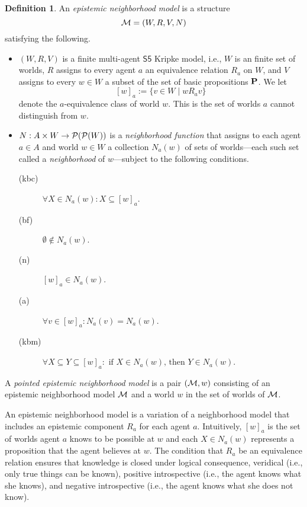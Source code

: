 \documentclass[12pt]{article}
\theoremstyle{definition}
\newtheorem{definition}[theorem]{Definition}
\newcommand{\pow}{{\cal P}}    %
\newcommand{\M}{{\cal M}}      %
\newcommand{\Prop}{{\bf P}}    %
\begin{document}
\begin{definition} 
  An \emph{epistemic neighborhood model} is a structure
  \[
  \M=(W,R,V,N)
  \]
  satisfying the following.
  \begin{itemize}
  \item $(W,R,V)$ is a finite multi-agent $\mathsf{S5}$ Kripke model, 
    i.e., $W$ is an finite set of worlds, $R$ assigns to every agent 
    $a$ an equivalence relation $R_a$ on $W$, and $V$ assigns to  
    every $w \in W$ a subset of the set of basic propositions $\Prop$. 
    We let 
    \[
    [w]_a:=\{v\in W\mid wR_av\}
    \]
    denote the $a$-equivalence class of world $w$.  This is the
    set of worlds $a$ cannot distinguish from $w$.

  \item $N : A\times W \to \pow(\pow(W))$ is a \emph{neighborhood
      function} that assigns to each agent $a\in A$ and world $w\in W$
    a collection $N_a(w)$ of sets of worlds---each such set called a
    \emph{neighborhood} of $w$---subject to the following conditions.
    \begin{description}
    \item[(kbc)] $\forall X \in N_a(w) : X \subseteq [w]_a$.

    \item[(bf)] $\emptyset\notin N_a(w)$.
      
    \item[(n)] $[w]_a\in N_a(w)$.
      
    \item[(a)] $\forall v \in [w]_a : N_a(v) = N_a(w)$.

    \item[(kbm)] $\forall X \subseteq Y \subseteq [w]_a : 
      \text{ if } X \in N_a(w) \text{, then } Y \in N_a(w)$.
   \end{description}
  \end{itemize}
  A \emph{pointed epistemic neighborhood model} is a pair $(\M,w)$
  consisting of an epistemic neighborhood model $\M$ and a world $w$
  in the set of worlds of $\M$. 
\end{definition}

An epistemic neighborhood model is a variation of a neighborhood model that
includes an epistemic component $R_a$ for each agent $a$.
Intuitively, $[w]_a$ is the set of worlds agent $a$ knows to be
possible at $w$ and each $X\in N_a(w)$ represents a proposition that
the agent believes at $w$.  The condition that $R_a$ be an equivalence
relation ensures that knowledge is closed under logical consequence,
veridical (i.e., only true things can be known), positive
introspective (i.e., the agent knows what she knows), and negative
introspective (i.e., the agent knows what she does not know).
\end{document}

